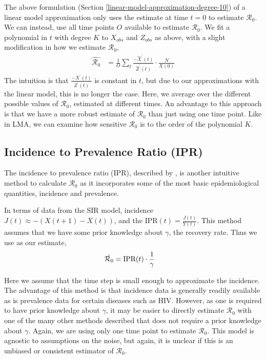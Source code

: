 \documentclass[12pt]{article}
\newcommand{\rr}{\ensuremath{\mathcal{R}_0}}
\begin{document}
The above formulation (Section \ref{linear-model-approximation-degree-10}) of a linear model approximation only uses the estimate at time $t=0$ to estimate $\rr$.  We can instead, use all time points $O$ available to estimate $\rr$.  We fit a polynomial in \(t\) with degree \(K\) to \(X_{obs}\)
and \(Z_{obs}\) as above, with a slight modification in how we estimate
\(\rr\),
\begin{align*}
  \hat{\rr} &= \frac{1}{O} \sum_t \frac{-\hat{X}^\prime(t)}{\hat{Z}^\prime(t)} \cdot \frac{N}{X(0)} 
\end{align*}
The intuition is that $\frac{-X^\prime(t)}{Z^\prime(t)}$ is constant in $t$, but due to our approximations with the linear model, this is no longer the case.  Here, we average over the different possible values of $\rr$, estimated at different times.  An advantage to this approach is that we have a more robust estimate of $\rr$ than just using one time point.  Like in LMA, we can examine how sensitive $\rr$ is to the order of the polynomial $K$.


\subsection{Incidence to Prevalence Ratio (IPR)}\label{incidence-to-prevalence-ratio}
The incidence to prevalence ratio (IPR), described by \cite{Nishiura2009}, is another intuitive method to calculate $\rr$ as it incorporates some of the most basic epidemiological quantities, incidence and prevalence.

In terms of data from the SIR model, incidence $J(t) \approx -(X(t+1) - X(t))$, and the IPR$(t) = \frac{J(t)}{Y(t)}$.  This method assumes that we have some prior knowledge about $\gamma$, the recovery rate.  Thus we use as our estimate,
\begin{align*}
\hat{\rr} &= \textnormal{IPR}(t) \cdot \frac{1}{\gamma}
\end{align*}

Here we assume that the time step is small enough to approximate the incidence.  The advantage of this method is that incidence data is generally readily available as is prevalence data for certain diseases such as HIV.  However, as one is required to have prior knowledge about $\gamma$, it may be easier to directly estimate $\rr$ with one of the many other methods described that does not require a prior knowledge about $\gamma$.  Again, we are using only one time point to estimate $\rr$.  This model is agnostic to assumptions on the noise, but again, it is unclear if this is an unbiased or consistent estimator of $\rr$.
\end{document}
